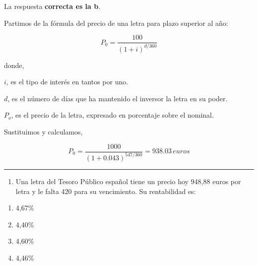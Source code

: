 \documentclass[
  letterpaper,
  DIV=11,
  numbers=noendperiod]{scrreprt}
\providecommand{\tightlist}{%
  \setlength{\itemsep}{0pt}\setlength{\parskip}{0pt}}\usepackage{longtable,booktabs,array}
\begin{document}
\begin{tcolorbox}[enhanced jigsaw, left=2mm, opacityback=0, colback=white, breakable, arc=.35mm, bottomrule=.15mm, rightrule=.15mm, toprule=.15mm, leftrule=.75mm, colframe=quarto-callout-tip-color-frame]
\begin{minipage}[t]{5.5mm}
\textcolor{quarto-callout-tip-color}{\faLightbulb}
\end{minipage}%
\begin{minipage}[t]{\textwidth - 5.5mm}

La respuesta \textbf{correcta es la b}.

Partimos de la fórmula del precio de una letra para plazo superior al
año:

\[P_0=\frac{100}{(1+i)^{d/360}}\]

donde,

\(i\), es el tipo de interés en tantos por uno.

\(d\), es el número de días que ha mantenido el inversor la letra en su
poder.

\(P_o\), es el precio de la letra, expresado en porcentaje sobre el
nominal.

Sustituimos y calculamos,

\[P_0=\frac{1000}{(1+0.043)^{547/360}}=938.03\,euros\]

\end{minipage}%
\end{tcolorbox}

\begin{center}\rule{0.5\linewidth}{0.5pt}\end{center}

\begin{enumerate}
\def\labelenumi{\arabic{enumi}.}
\setcounter{enumi}{9}
\tightlist
\item
  Una letra del Tesoro Público español tiene un precio hoy 948,88 euros
  por letra y le falta 420 para su vencimiento. Su rentabilidad es:
\end{enumerate}

\begin{enumerate}
\def\labelenumi{\alph{enumi}.}
\item
  4,67\%
\item
  4,40\%
\item
  4,60\%
\item
  4,46\%
\end{enumerate}
\end{document}
